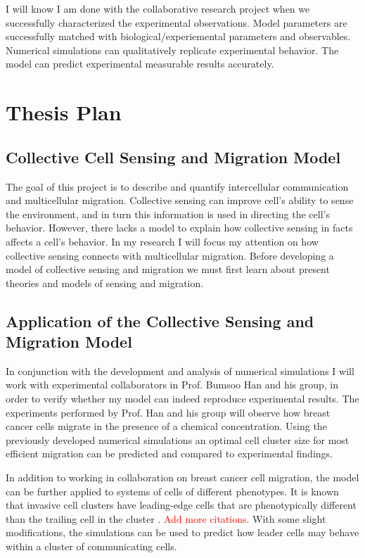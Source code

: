 \documentclass[a4paper]{article}
\renewcommand{\r}[1]{\textcolor{red}{#1}}
\begin{document}
I will know I am done with the collaborative research project when we successfully characterized the experimental observations. Model parameters are successfully matched with biological/experiemental parameters and observables. Numerical simulations can qualitatively replicate experimental behavior. The model can predict experimental measurable results accurately.

\section{Thesis Plan}

\subsection{Collective Cell Sensing and Migration Model}

The goal of this project is to describe and quantify intercellular communication and multicellular migration. Collective sensing can improve cell's ability to sense the environment, and in turn this information is used in directing the cell's behavior. However, there lacks a model to explain how collective sensing in facts affects a cell's behavior. In my research I will focus my attention on how collective sensing connects with multicellular migration. Before developing a model of collective sensing and migration we must first learn about present theories and models of sensing and migration.

\subsection{Application of the Collective Sensing and Migration Model}

In conjunction with the development and analysis of numerical simulations I will work with experimental collaborators in Prof. Bumsoo Han and his group, in order to verify whether my model can indeed reproduce experimental results. The experiments performed by Prof. Han and his group will observe how breast cancer cells migrate in the presence of a chemical concentration. Using the previously developed numerical simulations an optimal cell cluster size for most efficient migration can be predicted and compared to experimental findings.

In addition to working in collaboration on breast cancer cell migration, the model can be further applied to systems of cells of different phenotypes. It is known that invasive cell clusters have leading-edge cells that are phenotypically different than the trailing cell in the cluster \cite{cheung2013collective}. \r{Add more citations.} With some slight modifications, the simulations can be used to predict how leader cells may behave within a cluster of communicating cells.
\end{document}
